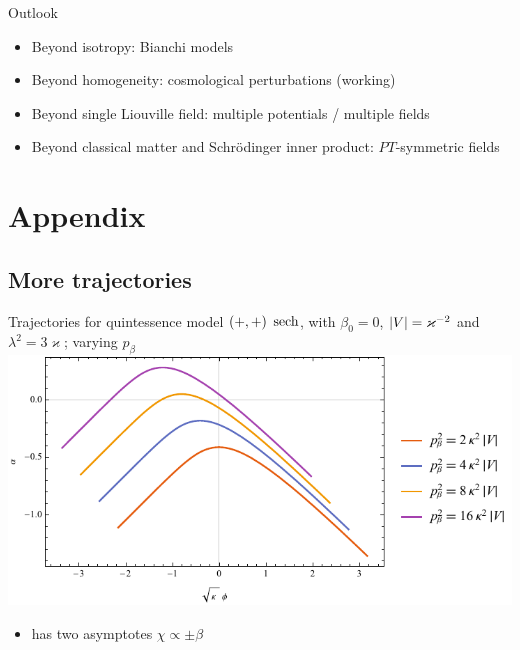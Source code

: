 \documentclass[8pt]{beamer}
\begin{document}
\begin{frame}%
{Outlook}%
\begin{itemize}
\item Beyond isotropy: Bianchi models

\item Beyond homogeneity: cosmological perturbations 
 (working)

\item Beyond single Liouville field: multiple potentials / multiple 
fields

\item Beyond classical matter and Schrödinger inner product: $PT$-symmetric 
fields

\end{itemize}
\end{frame}


\section*{Appendix}

\subsection*{More trajectories}

\begin{frame}%
{Trajectories for quintessence model ${\left(+,+\right)}$}%
{$\operatorname{sech}$, with $\beta_0 = 0$, ${\left|V\right|} = \varkappa^{-2}$ and
$\lambda^2 = 3\varkappa$; varying $p_\beta$}
\includegraphics[width=\textwidth]{../plots.nb/sech_pbet.pdf}
\begin{itemize}
	\item has two asymptotes $\chi \propto \pm \beta$
\end{itemize}
\end{frame}
\end{document}
